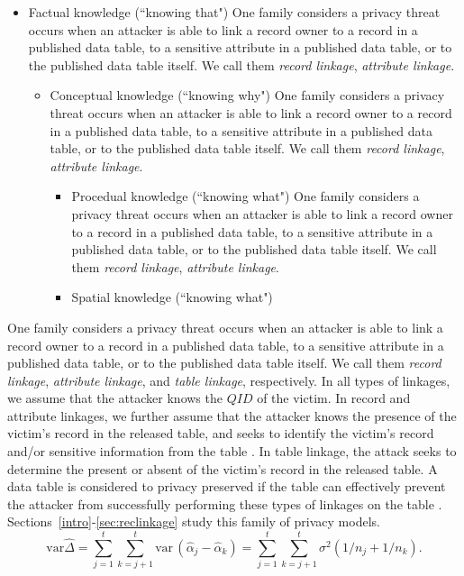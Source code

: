 \begin{itemize}
\item Factual knowledge (``knowing that") One family considers a privacy
threat occurs when an attacker is able to link a record owner to a record
in a published data table, to a sensitive attribute in a published data
table, or to the published data table itself. We call them \emph{record
linkage}, \emph{attribute linkage}.
\begin{itemize}
\item Conceptual knowledge (``knowing why") One family considers a privacy
threat occurs when an attacker is able to link a record owner to a record
in a published data table, to a sensitive attribute in a published data
table, or to the published data table itself. We call them \emph{record
linkage}, \emph{attribute linkage}.
\begin{itemize}
\item Procedual knowledge (``knowing what") One family considers a privacy
threat occurs when an attacker is able to link a record owner to a record
in a published data table, to a sensitive attribute in a published data
table, or to the published data table itself. We call them \emph{record
linkage}, \emph{attribute linkage}.
\item Spatial knowledge (``knowing what")
\end{itemize}
\end{itemize}
\end{itemize}


One family considers a privacy threat occurs when an attacker is able to link a record owner to a record in a published data table, to a sensitive attribute in a published data table, or to the published data table itself. We call them \emph{record linkage}, \emph{attribute linkage}, and \emph{table linkage}, respectively. In all types of linkages, we assume that the attacker knows the $QID$ of the victim. In record and attribute linkages, we further assume that the attacker knows the presence of the victim's record in the released table, and seeks to identify the victim's record and/or sensitive information from the table \cite{yao2002can}. In table linkage, the attack seeks to determine the present or absent of the victim's record in the released table. A data table is considered to privacy preserved if the table can effectively prevent the attacker from successfully performing these types of linkages on the table \cite{madden2002tta}. Sections~\ref{intro}-\ref{sec:reclinkage} study this family of privacy models.
\begin{equation}
\mbox{var}\widehat{\Delta} = \sum_{j = 1}^t \sum_{k = j+1}^t
\mbox{var}\,(\hat{\alpha}_j - \hat{\alpha}_k)  = \sum_{j = 1}^t
\sum_{k = j+1}^t \sigma^2(1/n_j + 1/n_k). \label{2delvart2}
\end{equation}

